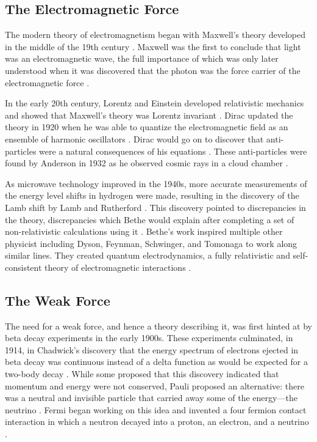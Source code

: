 \subsection{The Electromagnetic Force}
\label{subsection:electronmagnetic_force}

The modern theory of electromagnetism began with Maxwell's theory developed in
the middle of the 19th century \cite{maxwell1863}. Maxwell was the first to
conclude that light was an electromagnetic wave, the full importance of which
was only later understood when it was discovered that the photon was the force
carrier of the electromagnetic force \cite{maxwell1864}.

In the early 20th century, Lorentz and Einstein developed relativistic
mechanics and showed that Maxwell's theory was Lorentz invariant
\cite{lorentz1899}\cite{einstein1904}. Dirac updated the theory in 1920 when he
was able to quantize the electromagnetic field as an ensemble of harmonic
oscillators \cite{dirac1927}. Dirac would go on to discover that anti-particles
were a natural consequences of his equations \cite{dirac1928}\cite{dirac1930}.
These anti-particles were found by Anderson in 1932 as he observed cosmic rays
in a cloud chamber \cite{anderson1933}.

As microwave technology improved in the 1940s, more accurate measurements of
the energy level shifts in hydrogen were made, resulting in the discovery of
the Lamb shift by Lamb and Rutherford \cite{lamb1947}. This discovery pointed
to discrepancies in the theory, discrepancies which Bethe would explain after
completing a set of non-relativistic calculations using it \cite{bethe1947}.
Bethe's work inspired multiple other physicist including Dyson, Feynman,
Schwinger, and Tomonaga to work along similar lines. They created quantum
electrodynamics, a fully relativistic and self-consistent theory of
electromagnetic interactions
\cite{tomonaga1946}\cite{schwinger1948}\cite{feynman1949}\cite{dyson1949}.

\subsection{The Weak Force}
\label{subsection:weak_force}

The need for a weak force, and hence a theory describing it, was first hinted
at by beta decay experiments in the early 1900s. These experiments culminated,
in 1914, in Chadwick's discovery that the energy spectrum of electrons ejected
in beta decay was continuous instead of a delta function as would be expected
for a two-body decay \cite{chadwick1914}. While some proposed that this
discovery indicated that momentum and energy were not conserved, Pauli proposed
an alternative: there was a neutral and invisible particle that carried away
some of the energy---the neutrino \cite{pauli1930}. Fermi began working on this
idea and invented a four fermion contact interaction in which a neutron decayed
into a proton, an electron, and a neutrino \cite{fermi1934}.

